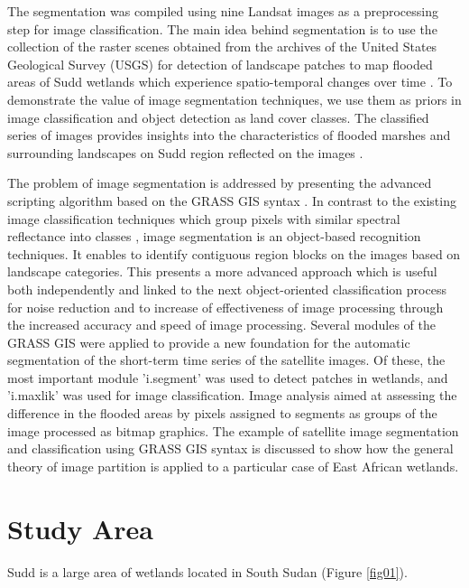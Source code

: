 \documentclass[analytics,article,submit,pdftex,moreauthors]{Definitions/mdpi}
\begin{document}
The segmentation was compiled using nine Landsat images as a preprocessing step for image classification. The main idea behind segmentation is to use the collection of the raster scenes obtained from the archives of the United States Geological Survey (USGS) for detection of landscape patches to map flooded areas of Sudd wetlands which experience spatio-temporal changes over time \cite{Petersen,SOSNOWSKI201651,Mulatu}. To demonstrate the value of image segmentation techniques, we use them as priors in image classification and object detection as land cover classes. The classified series of images provides insights into the characteristics of flooded marshes and surrounding landscapes on Sudd region reflected on the images \cite{CHEN201417}. 

The problem of image segmentation is addressed by presenting the advanced scripting algorithm based on the GRASS GIS syntax \cite{Lemenkova202125,jmse11040871,HOFIERKA2009387,technologies11020046}. In contrast to the existing image classification techniques which group pixels with similar spectral reflectance into classes \cite{DIVITTORIO20181,info14040249,Campos,Lemenkova202229}, image segmentation is an object-based recognition techniques. It enables to identify contiguous region blocks on the images based on landscape categories. This presents a more advanced approach which is useful both independently and linked to the next object-oriented classification process for noise reduction and to increase of effectiveness of image processing through the increased accuracy and speed of image processing. Several modules of the GRASS GIS were applied to provide a new foundation for the automatic segmentation of the short-term time series of the satellite images. Of these, the most important module 'i.segment' was used to detect patches in wetlands, and 'i.maxlik' was used for image classification. Image analysis aimed at assessing the difference in the flooded areas by pixels assigned to segments as groups of the image processed as bitmap graphics. The example of satellite image segmentation and classification using GRASS GIS syntax is discussed to show how the general theory of image partition is applied to a particular case of East African wetlands.

\section{Study Area}

Sudd is a large area of wetlands located in South Sudan (Figure \ref{fig01}). 
\end{document}
